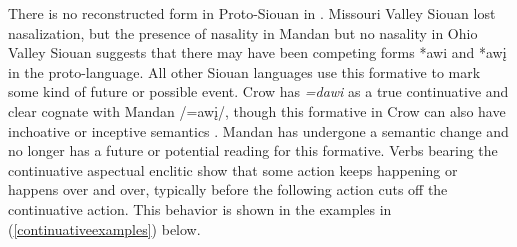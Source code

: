 There is no reconstructed form in Proto-Siouan in \citet{rankin2015}. Missouri Valley Siouan lost nasalization, but the presence of nasality in Mandan but no nasality in Ohio Valley Siouan suggests that there may have been competing forms *awi and *awį in the proto-language. All other Siouan languages use this formative to mark some kind of future or possible event. Crow has \textit{=dawi} as a true continuative and clear cognate with Mandan /=awį/, though this formative in Crow can also have inchoative or inceptive semantics \citep[307]{graczyk2007}. Mandan has undergone a semantic change and no longer has a future or potential reading for this formative. Verbs bearing the continuative aspectual enclitic show that some action keeps happening or happens over and over, typically before the following action cuts off the continuative action. This behavior is shown in the examples in (\ref{continuativeexamples}) below.

